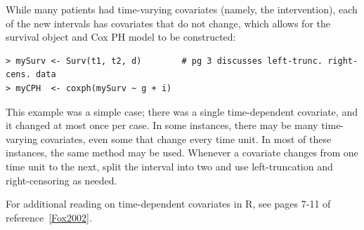 \documentclass[11pt]{article}
\newcommand{\R}[1]{\textsf{R}}
\begin{document}
While many patients had time-varying covariates (namely, the intervention), each of the new intervals has covariates that do not change, which allows for the survival object and Cox PH model to be constructed:
{\color{verbatimrcom}\begin{verbatim}
> mySurv <- Surv(t1, t2, d)        # pg 3 discusses left-trunc. right-cens. data
> myCPH  <- coxph(mySurv ~ g + i)
\end{verbatim}}

This example was a simple case; there was a single time-dependent covariate, and it changed at most once per case. In some instances, there may be many time-varying covariates, even some that change every time unit. In most of these instances, the same method may be used. Whenever a covariate changes from one time unit to the next, split the interval into two and use left-truncation and right-censoring as needed.

For additional reading on time-dependent covariates in \R{}, see pages 7-11 of reference~\ref{Fox2002}.
\end{document}

